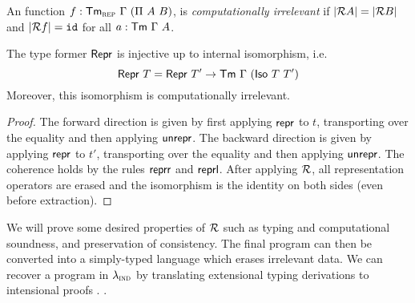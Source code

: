 \begin{definition}
    An function $f : \mta{Tm}_\rep\ \Gamma\ (\Pi\ A\ B)$, is \emph{computationally irrelevant} if
    $|\mathcal{R} A| = |\mathcal{R} B|$ and $|\mathcal{R} f| = \texttt{id}$ for all $a : \textsf{Tm}\ \Gamma\ A$.
\end{definition}

\begin{lemma}
	The type former $\textsf{Repr}{}$ is injective up to internal isomorphism, i.e.
	\begin{equation}
	\mta{Repr}\ T = \mta{Repr}\ T' \to \Tm\ \Gamma\ (\mta{Iso}\ T\ T')
	\end{equation}
	Moreover, this isomorphism is computationally irrelevant.
	\begin{proof}
	The forward direction is given by first applying $\textsf{repr}$ to $t$,
	transporting over the equality and then applying $\textsf{unrepr}$. The
	backward direction is given by applying $\textsf{repr}$ to $t'$, transporting
	over the equality and then applying $\textsf{unrepr}$. The coherence holds by
	the rules $\textsf{reprr}$ and $\textsf{reprl}$. After applying $\mathcal{R}$, all
	representation operators are erased and the isomorphism is the identity on both
	sides (even before extraction).
	\end{proof}
\end{lemma}


We will prove some desired properties
of $\mathcal{R}$ \cite{Boulier2017-cm} such as typing and computational soundness, and
preservation of consistency. The final program can then be converted into a
simply-typed language which erases irrelevant data. We can recover a program in
$\lambda_{\textsc{ind}}$ by translating extensional typing derivations to intensional proofs
\cite{Winterhalter2019-zw}.
\cite{Winterhalter2019-zw}.
